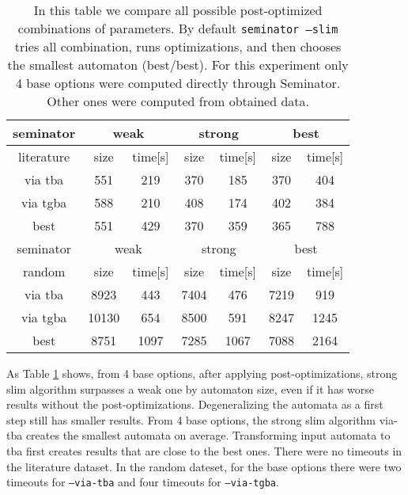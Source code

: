 \documentclass[
	digital,
nolof, nolot
]{fithesis3}
\begin{document}
	\begin{table}[ht]
		
		\centering
		\caption{In this table we compare all possible post-optimized combinations of parameters. By default \texttt{seminator --slim} tries all combination, runs optimizations, and then chooses the smallest automaton (best/best). For this experiment only 4 base options were computed directly through Seminator. Other ones were computed from obtained data.}
		\label{table:seminator:optimized}
		\begin{tabular}{ |c||c|c|c|c|c|c| } 
			\hline
			seminator&\multicolumn{2}{c|}{weak}&\multicolumn{2}{c|}{strong}&\multicolumn{2}{c|}{best} \\
			\hline
			literature&size&time[s]&size&time[s]&size&time[s]\\
			\hhline{|=======|}
			
			via tba&551&219& 370 &185& 370&404\\
			\hline
			via tgba&588&210& 408&174& 402&384\\ 
			\hline
			best&551&429& 370&359& 365&788 \\ 
			\hline
			
			
			\hline
			seminator&\multicolumn{2}{c|}{weak}&\multicolumn{2}{c|}{strong}&\multicolumn{2}{c|}{best} \\
			\hline
			random&size&time[s]&size&time[s]&size&time[s]\\
			\hhline{|=======|}
			via tba&8923&443& 7404 &476& 7219&919\\
			\hline
			via tgba&10130&654& 8500&591& 8247&1245\\ 
			\hline
			best&8751&1097& 7285&1067& 7088&2164 \\ 
			\hline
		\end{tabular}
	\end{table}

	
	As Table \ref{table:seminator:optimized} shows, from 4 base options, after applying post-optimizations, strong slim algorithm surpasses a weak one by automaton size, even if it has worse results without the post-optimizations.
	Degeneralizing the automata as a first step still has smaller results.
	From 4 base options, the strong slim algorithm via-tba creates the smallest automata on average.
	Transforming input automata to tba first creates results that are close to the best ones. There were no timeouts in the literature dataset. In the random dateset, for the base options there were two timeouts for \texttt{--via-tba} and four timeouts for \texttt{--via-tgba}.
	
\end{document}
